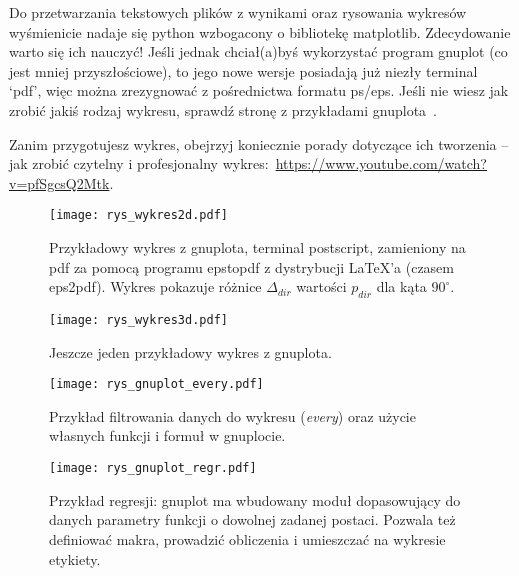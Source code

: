 \documentclass{article}
\begin{document}
\noindent Do przetwarzania tekstowych plików z wynikami oraz rysowania wykresów wyśmienicie nadaje się python wzbogacony o bibliotekę matplotlib. Zdecydowanie warto się ich nauczyć! Jeśli jednak chciał(a)byś wykorzystać program gnuplot (co jest mniej przyszłościowe), to jego nowe wersje posiadają już niezły terminal `pdf', więc można zrezygnować z pośrednictwa formatu ps/eps. Jeśli nie wiesz jak zrobić jakiś rodzaj wykresu, sprawdź stronę z przykładami gnuplota~\cite{GnuplotDemos}.

Zanim przygotujesz wykres, obejrzyj koniecznie porady dotyczące ich tworzenia -- jak zrobić czytelny i profesjonalny wykres:~\url{https://www.youtube.com/watch?v=pfSgcsQ2Mtk}. %


\begin{figure}
\begin{center}
\texttt{[image: rys\_wykres2d.pdf]}
\end{center}
\caption{Przykładowy wykres z gnuplota, terminal postscript, zamieniony na pdf za pomocą programu epstopdf z dystrybucji LaTeX'a (czasem eps2pdf). Wykres pokazuje różnice $\Delta_{dir}$ wartości $p_{dir}$ dla kąta $90^\circ$.}
\label{fig:1Tdelta}
\end{figure}

\begin{figure}
\begin{center}
\texttt{[image: rys\_wykres3d.pdf]}
\end{center}
\caption{Jeszcze jeden przykładowy wykres z gnuplota.}
\label{fig:3d}
\end{figure}

\begin{figure}
\begin{center}
\texttt{[image: rys\_gnuplot\_every.pdf]}
\end{center}
\caption{Przykład filtrowania danych do wykresu (\emph{every}) oraz użycie własnych funkcji i formuł w gnuplocie.}
\label{fig:every}
\end{figure}

\begin{figure}
\begin{center}
\texttt{[image: rys\_gnuplot\_regr.pdf]}
\end{center}
\caption{Przykład regresji: gnuplot ma wbudowany moduł dopasowujący do danych parametry funkcji o dowolnej zadanej postaci. Pozwala też definiować makra, prowadzić obliczenia i umieszczać na wykresie etykiety.}
\label{fig:regr}
\end{figure}
\end{document}
